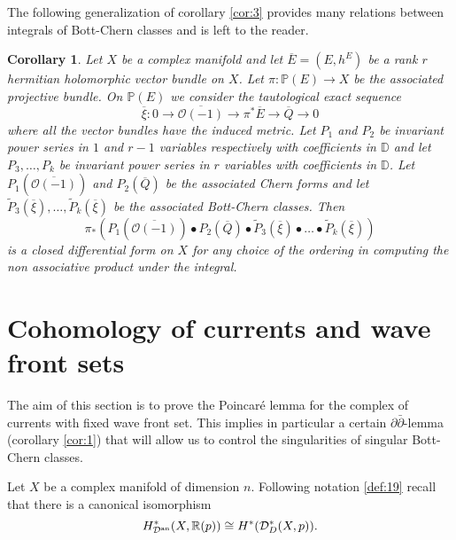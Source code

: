 \documentclass[10pt,twoside]{article}
\numberwithin{equation}{section}
\theoremstyle{plain}
\newtheorem{corollary}[equation]{Corollary}
\theoremstyle{definition}
\newcommand{\an}{\text{{\rm an}}}
\begin{document}
The following generalization of corollary \ref{cor:3} provides many
relations between integrals of Bott-Chern classes and is left to the
reader.  


\begin{corollary}\label{cor:11}
  Let $X$ be a complex manifold and let $\overline E=(E,h^{E})$ be a
  rank $r$ hermitian holomorphic 
  vector bundle on $X$. Let $\pi\colon\mathbb{P}(E)\longrightarrow X$ be
  the associated projective bundle. On $\mathbb{P}(E)$ we consider the
  tautological exact sequence
  \begin{displaymath}
    \overline \xi\colon
    0\longrightarrow \overline {\mathcal{O}(-1)}\longrightarrow \pi
    ^{\ast}\overline E
    \longrightarrow \overline Q \longrightarrow 0
  \end{displaymath}
  where all the vector bundles have the induced metric. Let $P_{1}$ and
  $P_{2}$ be invariant power series in $1$ and $r-1$
  variables respectively with coefficients in $\mathbb{D}$ and let
  $P_{3},\dots ,P_{k}$ be  invariant power series in $r$
  variables with coefficients in $\mathbb{D}$.
  Let
  $P_{1}(\overline {\mathcal{O}(-1)})$ and 
  $P_{2}(\overline Q)$ be the associated Chern forms and let
  $\widetilde {P}_{3}(\overline {\xi}),\dots ,\widetilde
  {P}_{k}(\overline {\xi})$ be the associated Bott-Chern
  classes. Then 
  $$\pi_{\ast}(P_{1}(\overline {\mathcal{O}(-1)})\bullet
  P_{2}(\overline Q)\bullet
  \widetilde {P}_{3}(\overline {\xi})\bullet \dots \bullet
  \widetilde {P}_{k}(\overline {\xi}))$$ 
  is a closed differential form
  on $X$ for any choice of the ordering in computing the non
  associative product under the integral. 
\end{corollary}






\section{Cohomology of currents and wave front sets}
\label{sec:cohom-curr-wave}

The aim of this section is to prove the Poincar\'e lemma for the
complex of currents with fixed wave front set. This implies in
particular a certain $\partial\bar\partial$-lemma (corollary
\ref{cor:1}) that will allow us to control the singularities of
singular Bott-Chern classes.

 
Let $X$ be a complex manifold of dimension $n$.
Following notation \ref{def:19} recall that there is a canonical
isomorphism   
\begin{displaymath}
  H^{\ast}_{\mathcal{D}^{\an}}(X,\mathbb{R}(p))\cong
  H^{\ast}(\mathcal{D}^{\ast}_{D}(X,p)).
\end{displaymath}
\end{document}
